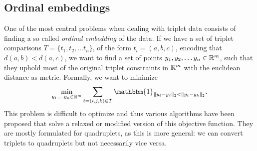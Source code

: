 \subsection{Ordinal embeddings}
One of the most central problems when dealing with triplet data consists of finding a so called \textit{ordinal embedding} of the data. If we have a set of triplet comparisons $T = \{t_1, t_2, \ldots t_n\}$, 
of the form $t_i = \left( a,b,c \right)$, encoding that $d(a,b) < d(a,c)$, 
we want to find a set of points $y_1, y_2, \ldots y_n \in \mathbb{R}^{m}$, such that they uphold most of the original triplet constraints in $\mathbb{R}^{m}$ with the euclidean distance
as metric. Formally, we want to minimize \citep{vankadaraInsightsOrdinalEmbedding2021}
\begin{align*}
    \min_{y_1, \ldots y_n \in \R^{m}} \sum_{t=\left( i,j,k \right)  \in T} \mathbbm{1}_{ \|y_i - y_j\|_2 < \|y_i - y_k\|_2 }
.\end{align*}
This problem is difficult to optimize and thus various algorithms have been proposed that solve a relaxed or modified version of this objective function. They are mostly formulated
for quadruplets, as this is more general: we can convert triplets to quadruplets but not 
necessarily vice versa.


